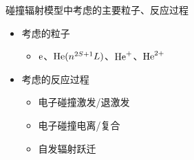 \begin{CJK*}{UTF8}{kai}
\begin{frame}{碰撞辐射模型中考虑的主要粒子、反应过程}
	\begin{itemize}
		\item 考虑的粒子
		\begin{itemize}
			\item ${\rm e}$、${\rm He}(n^{2S+1}L)$、${\rm He}^+$、${\rm He}^{2+}$
		\end{itemize}
		\bigskip
		\item 考虑的反应过程
		\begin{itemize}
			\item 电子碰撞激发/退激发
			\item 电子碰撞电离/复合
			\item 自发辐射跃迁
		\end{itemize}
	\end{itemize}
\end{frame}


\end{CJK*}
